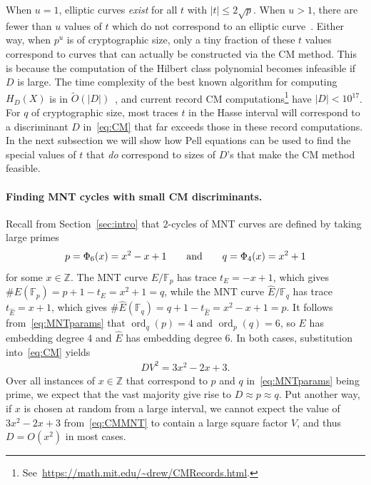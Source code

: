 \documentclass[version=preprint]{iacrcc}
\DeclareMathOperator{\ord}{ord}
\newcommand{\Z}{\mathbb{Z}}
\newcommand{\F}{\mathbb{F}}
\begin{document}
When $u=1$, elliptic curves \emph{exist} for all $t$ with $|t| \leq 2\sqrt{p}$. When $u>1$, there are fewer than $u$ values of $t$ which do not correspond to an elliptic curve~\cite[Theorem 4.2]{Schoof87}. Either way, when $p^u$ is of cryptographic size, only a tiny fraction of these $t$ values correspond to curves that can actually be constructed via the CM method. This is because the computation of the Hilbert class polynomial becomes infeasible if $D$ is large. The time complexity of the best known algorithm for computing $H_D(X)$ is in $\tilde{O}(|D|)$~\cite{Sutherland12}, and current record CM computations\footnote{See~\url{https://math.mit.edu/~drew/CMRecords.html}.} have $|D| < 10^{17}$. For $q$ of cryptographic size, most traces $t$ in the Hasse interval will correspond to a discriminant $D$ in~\eqref{eq:CM} that far exceeds those in these record computations. In the next subsection we will show how Pell equations can be used to find the special values of $t$ that \emph{do} correspond to sizes of $D$'s that make the CM method feasible. 

\paragraph{Finding MNT cycles with small CM discriminants.} Recall from Section~\ref{sec:intro} that $2$-cycles of MNT curves are defined by taking large primes 
\begin{align}\label{eq:MNTparams}
p=\Phi_6(x)=x^2-x+1 \quad \quad {\rm and} \quad\quad q=\Phi_4(x)=x^2+1 
\end{align}
 for some $x \in \Z$. The MNT curve $E/\F_p$ has trace $t_E=-x+1$, which gives $\#E(\F_p)=p+1-t_E = x^2+1=q$, while the MNT curve $\hat{E}/\F_q$ has trace $t_{\hat{E}}=x+1$, which gives $\#\hat{E}(\F_q)=q+1-t_{\hat{E}} = x^2-x+1=p$. It follows from~\eqref{eq:MNTparams} that $\ord_{q}(p)=4$ and $\ord_{p}(q)=6$, so $E$ has embedding degree 4 and $\hat{E}$ has embedding degree 6. In both cases, substitution into~\eqref{eq:CM} yields 
\begin{align}\label{eq:CMMNT}
DV^2=3x^2-2x+3. 
\end{align}
Over all instances of $x \in \Z$ that correspond to $p$ and $q$ in~\eqref{eq:MNTparams} being prime, we expect that the vast majority give rise to $D \approx p \approx q$. Put another way, if $x$ is chosen at random from a large interval, we cannot expect the value of $3x^2-2x+3$ from~\eqref{eq:CMMNT} to contain a large square factor $V$, and thus $D = O(x^2)$ in most cases. 
\end{document}
